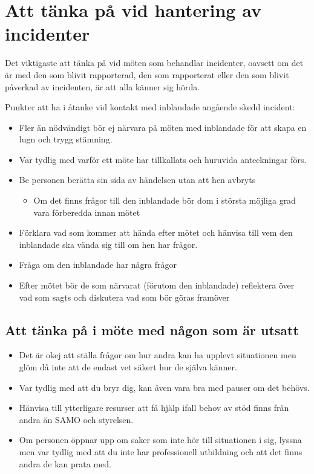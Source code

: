 \documentclass{dtek}
\begin{document}
\section{Att tänka på vid hantering av incidenter}
Det viktigaste att tänka på vid möten som behandlar incidenter, oavsett om det är med den som blivit rapporterad, den som rapporterat eller den som blivit påverkad av incidenten, är att alla känner sig hörda.

Punkter att ha i åtanke vid kontakt med inblandade angående skedd incident:
\begin{itemize}
    \item Fler än nödvändigt bör ej närvara på möten med inblandade för att skapa en lugn och trygg stämning.
    \item Var tydlig med varför ett möte har tillkallats och huruvida anteckningar förs.
    \item Be personen berätta sin sida av händelsen utan att hen avbryts
    \begin{itemize}
        \item Om det finns frågor till den inblandade bör dom i största möjliga grad vara förberedda innan mötet
    \end{itemize}
    \item Förklara vad som kommer att hända efter mötet och hänvisa till vem den inblandade ska vända sig till om hen har frågor.
    \item Fråga om den inblandade har några frågor
    \item Efter mötet bör de som närvarat (förutom den inblandade) reflektera över vad som sagts och diskutera vad som bör göras framöver
\end{itemize}

\subsection{Att tänka på i möte med någon som är utsatt}
\begin{itemize}
    \item Det är okej att ställa frågor om hur andra kan ha upplevt situationen men glöm då inte att de endast vet säkert hur de själva känner.
    \item Var tydlig med att du bryr dig, kan även vara bra med pauser om det behövs.
    \item Hänvisa till ytterligare resurser att få hjälp ifall behov av stöd finns från andra än SAMO och styrelsen.
    \item Om personen öppnar upp om saker som inte hör till situationen i sig, lyssna men var tydlig med att du inte har professionell utbildning och att det finns andra de kan prata med.
\end{itemize}
\end{document}

